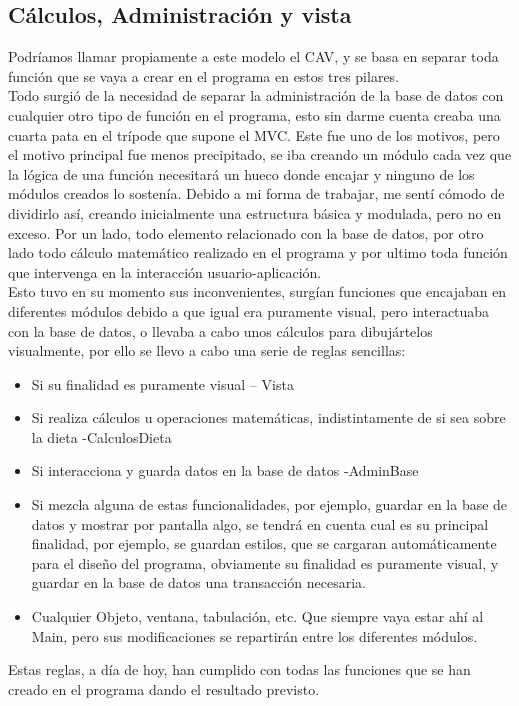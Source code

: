 \subsection{Cálculos, Administración y vista}
Podríamos llamar propiamente a este modelo el CAV, y se basa en separar toda función que se vaya a crear en el programa en estos tres pilares. \\
Todo surgió de la necesidad de separar la administración de la base de datos con cualquier otro tipo de función en el programa, esto sin darme cuenta creaba una cuarta pata en el trípode que supone el MVC. Este fue uno de los motivos, pero el motivo principal fue menos precipitado, se iba creando un módulo cada vez que la lógica de una función necesitará un hueco donde encajar y ninguno de los módulos creados lo sostenía. Debido a mi forma de trabajar, me sentí cómodo de dividirlo así, creando inicialmente una estructura básica y modulada, pero no en exceso. Por un lado, todo elemento relacionado con la base de datos, por otro lado todo cálculo matemático realizado en el programa y por ultimo toda función que intervenga en la interacción usuario-aplicación.\\

Esto tuvo en su momento sus inconvenientes, surgían funciones que encajaban en diferentes módulos debido a que igual era puramente visual, pero interactuaba con la base de datos, o llevaba a cabo unos cálculos para dibujártelos visualmente, por ello se llevo a cabo una serie de reglas sencillas:
\begin{itemize}
\item	Si su finalidad es puramente visual – Vista
\item	Si realiza cálculos u operaciones matemáticas, indistintamente de si sea sobre la dieta -CalculosDieta
\item	Si interacciona y guarda datos en la base de datos -AdminBase
\item	Si mezcla alguna de estas funcionalidades, por ejemplo, guardar en la base de datos y mostrar por pantalla algo, se tendrá en cuenta cual es su principal finalidad, por ejemplo, se guardan estilos, que se cargaran automáticamente para el diseño del programa, obviamente su finalidad es puramente visual, y guardar en la base de datos una transacción necesaria.
\item	Cualquier Objeto, ventana, tabulación, etc. Que siempre vaya estar ahí al Main, pero sus modificaciones se repartirán entre los diferentes módulos.

\end{itemize}
Estas reglas, a día de hoy, han cumplido con todas las funciones que se han creado en el programa dando el resultado previsto.
